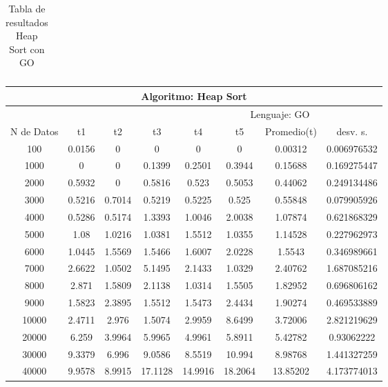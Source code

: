 \documentclass{article}
\begin{document}
\begin{table}[]
\begin{tabular}{|c|c|c|c|c|c|c|c| }
    \end{tabular}
        \caption{Tabla de resultados Heap Sort con GO}
        \label{tab:heapSortC}
    \end{table}

             \begin{table}[]
        \begin{tabular}{|c|c|c|c|c|c|c|c| }
            \hline
            \multicolumn{8}{|c|}{Algoritmo: Heap Sort} \\ \hline
            \multicolumn{4}{|c|}{} & \multicolumn{4}{c|}{Lenguaje: GO} \\ \hline
              N de Datos &     t1    &  t2         &  t3          &   t4        &    t5     &   Promedio(t)       & desv. s. \\ \hline
                100	&0.0156	&0	&0	&0	&0	&0.00312	&0.006976532\\ \hline
                1000	&0	&0	&0.1399	&0.2501	&0.3944	&0.15688	&0.169275447\\ \hline
                2000	&0.5932	&0	&0.5816	&0.523	&0.5053	&0.44062	&0.249134486\\ \hline
                3000	&0.5216	&0.7014	&0.5219	&0.5225	&0.525	&0.55848	&0.079905926\\ \hline
                4000	&0.5286	&0.5174	&1.3393	&1.0046	&2.0038	&1.07874	&0.621868329\\ \hline
                5000	&1.08	&1.0216	&1.0381	&1.5512	&1.0355	&1.14528	&0.227962973\\ \hline
                6000	&1.0445	&1.5569	&1.5466	&1.6007	&2.0228	&1.5543	&0.346989661\\ \hline
                7000	&2.6622	&1.0502	&5.1495	&2.1433	&1.0329	&2.40762	&1.687085216\\ \hline
                8000	&2.871	&1.5809	&2.1138	&1.0314	&1.5505	&1.82952	&0.696806162\\ \hline
                9000	&1.5823	&2.3895	&1.5512	&1.5473	&2.4434	&1.90274	&0.469533889\\ \hline
                10000	&2.4711	&2.976	&1.5074	&2.9959	&8.6499	&3.72006	&2.821219629\\ \hline
                20000	&6.259	&3.9964	&5.9965	&4.9961	&5.8911	&5.42782	&0.93062222\\ \hline
                30000	&9.3379	&6.996	&9.0586	&8.5519	&10.994	&8.98768	&1.441327259\\ \hline
                40000	&9.9578	&8.9915	&17.1128	&14.9916	&18.2064	&13.85202&	4.173774013\\ \hline

\end{tabular}
\end{table}
\end{document}

